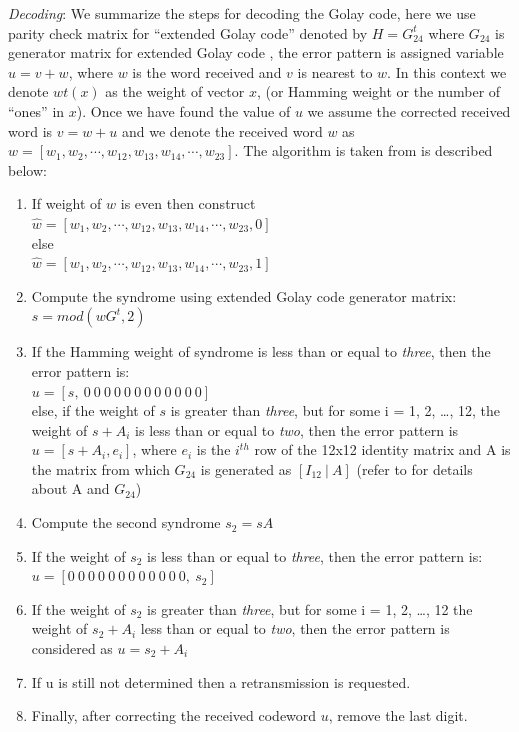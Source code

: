 \emph{Decoding}: We summarize the steps for decoding the Golay code, here we use parity check matrix for ``extended Golay code'' denoted by $H = G^t_{24}$ where $G_{24}$ is generator matrix for extended Golay code \cite{golay}, the error pattern is assigned variable $u = v + w$, where $w$ is the word received and $v$ is nearest to $w$. In this context we denote $wt(x)$ as the weight of vector $x$, (or Hamming weight or the number of ``ones'' in $x$). Once we have found the value of $u$ we assume the
corrected received word is $v = w + u$ and we denote the received word $w$ as $w = [w_1, w_2, \cdots , w_{12}, w_{13}, w_{14}, \cdots , w_{23}]$. The algorithm is taken from \cite{golay} is described below:
\begin{enumerate}
	\item If weight of $w$ is even then construct\\
		\tab $\hat{w} = [ w_1, w_2, \cdots , w_{12}, w_{13}, w_{14}, \cdots , w_{23}, 0]$\\
		  else\\
		\tab $\hat{w} = [ w_1, w_2, \cdots , w_{12}, w_{13}, w_{14}, \cdots , w_{23}, 1]$\\
	\item Compute the syndrome using extended Golay code generator matrix:\\
		\tab \tab \tab \tab $s = mod(wG^t, 2)$
	\item If the Hamming weight of syndrome is less than or equal to \emph{three}, then the error pattern is:\\
		\tab \tab \tab $u = [s,\  0\  0\  0\  0\  0\  0\  0\  0\  0\  0\  0\  0]$\\
		else, if the weight of $s$ is greater than \emph{three}, but for some i = 1, 2, \ldots, 12, the weight of $s + A_i$ is less than or equal to \emph{two}, then the error pattern is $u = [ s + A_i, e_i]$, where $e_i$ is the $i^{th}$ row of the 12x12 identity matrix and A is the matrix from which $G_{24}$ is generated as $[I_{12}\:|\:A]$ (refer to \cite{golay} for details about A and $G_{24}$)
	\item Compute the second  syndrome $s_2 = s A$
	\item If the weight of $s_2$ is less than or equal to \emph{three}, then the error pattern is:\\
		\tab \tab \tab $u = [ 0\  0\  0\  0\  0\  0\  0\  0\  0\  0\  0\  0,\ s_2]$
	\item If the weight of $s_2$ is greater than \emph{three}, but for some i = 1, 2, \ldots, 12 the weight of $s_2 + A_i$ less than or equal to \emph{two}, then the error pattern is considered as $u = s_2 + A_i$
	\item If u is still not determined then a retransmission is requested.

	\item Finally, after correcting the received codeword $u$, remove the last digit.
\end{enumerate}

